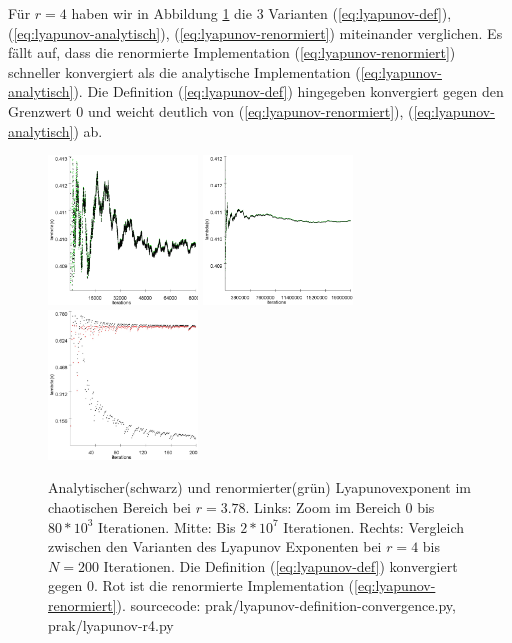 \documentclass[12pt,a4paper]{article}
\begin{document}
Für $r=4$ haben wir in Abbildung \ref{fig:lyapunov-chaos} die 3 Varianten (\ref{eq:lyapunov-def}), (\ref{eq:lyapunov-analytisch}), (\ref{eq:lyapunov-renormiert}) miteinander verglichen. Es fällt auf, dass die renormierte Implementation (\ref{eq:lyapunov-renormiert}) schneller konvergiert als die analytische Implementation (\ref{eq:lyapunov-analytisch}). 
Die Definition (\ref{eq:lyapunov-def}) hingegeben konvergiert gegen den Grenzwert 0 und weicht deutlich von (\ref{eq:lyapunov-renormiert}), (\ref{eq:lyapunov-analytisch}) ab.
\begin{figure}[!htbp]
\centering
\includegraphics[height=150px]{lya378-zoom}
\includegraphics[height=150px]{lya378}
\includegraphics[height=150px, width=150px]{lyapunov_r4}
\caption{Analytischer(schwarz) und renormierter(grün) Lyapunovexponent im chaotischen Bereich bei $r=3.78$. Links: Zoom im Bereich 0 bis $80*10^3$ Iterationen. Mitte: Bis $2*10^7$ Iterationen. Rechts: Vergleich zwischen den Varianten des Lyapunov Exponenten bei $r=4$ bis $N=200$ Iterationen. Die Definition (\ref{eq:lyapunov-def}) konvergiert gegen 0. Rot ist die renormierte Implementation (\ref{eq:lyapunov-renormiert}). sourcecode: prak/lyapunov-definition-convergence.py, prak/lyapunov-r4.py}
\label{fig:lyapunov-chaos}
\end{figure}
\end{document}
